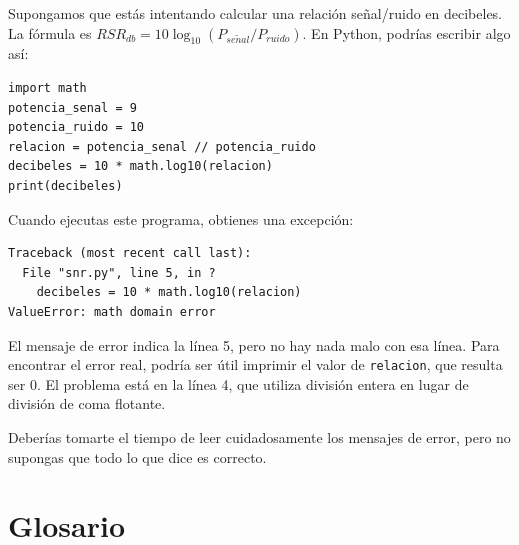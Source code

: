 \documentclass[10pt]{book}
\begin{document}
Supongamos que estás intentando
calcular una relación señal/ruido en decibeles.  La fórmula
es $RSR_{db} = 10 \log_{10} (P_{se\tilde{n}al} / P_{ruido})$.  En Python,
podrías escribir algo así:

\begin{verbatim}
import math
potencia_senal = 9
potencia_ruido = 10
relacion = potencia_senal // potencia_ruido
decibeles = 10 * math.log10(relacion)
print(decibeles)
\end{verbatim}
%
Cuando ejecutas este programa, obtienes una excepción:
%

\begin{verbatim}
Traceback (most recent call last):
  File "snr.py", line 5, in ?
    decibeles = 10 * math.log10(relacion)
ValueError: math domain error
\end{verbatim}
%
El mensaje de error indica la línea 5, pero no hay nada
malo con esa línea.  Para encontrar el error real, podría ser
útil imprimir el valor de {\tt relacion}, que resulta
ser 0.  El problema está en la línea 4, que utiliza división entera
en lugar de división de coma flotante.

Deberías tomarte el tiempo de leer cuidadosamente los mensajes de error, pero no
supongas que todo lo que dice es correcto.


\section{Glosario}
\end{document}
